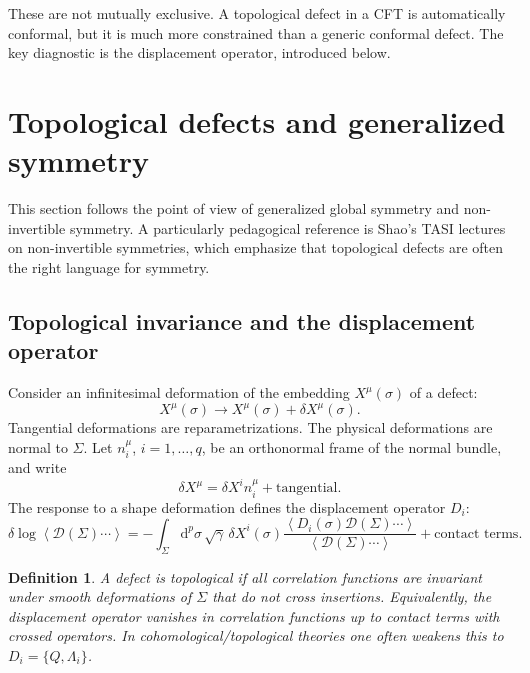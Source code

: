 \documentclass[11pt]{article}
\newtheorem{definition}[theorem]{Definition}
\newcommand{\dd}{\mathrm{d}}
\newcommand{\cD}{\mathcal{D}}
\newcommand{\vev}[1]{\left\langle #1\right\rangle}
\begin{document}
These are not mutually exclusive.  A topological defect in a CFT is automatically conformal, but it is much more constrained than a generic conformal defect.  The key diagnostic is the displacement operator, introduced below.

\section{Topological defects and generalized symmetry}

This section follows the point of view of generalized global symmetry and non-invertible symmetry.  A particularly pedagogical reference is Shao's TASI lectures on non-invertible symmetries, which emphasize that topological defects are often the right language for symmetry.

\subsection{Topological invariance and the displacement operator}

Consider an infinitesimal deformation of the embedding $X^\mu(\sigma)$ of a defect:
\begin{equation}
  X^\mu(\sigma)\longrightarrow X^\mu(\sigma)+\delta X^\mu(\sigma) .
\end{equation}
Tangential deformations are reparametrizations.  The physical deformations are normal to $\Sigma$.  Let $n_i^\mu$, $i=1,\dots,q$, be an orthonormal frame of the normal bundle, and write
\begin{equation}
  \delta X^\mu=\delta X^i n_i^\mu+\text{tangential} .
\end{equation}
The response to a shape deformation defines the displacement operator $D_i$:
\begin{equation}
  \delta \log \vev{\cD(\Sigma)\cdots}
  =-\int_\Sigma \dd^p\sigma\,\sqrt{\gamma}\,\delta X^i(\sigma)
  \frac{\vev{D_i(\sigma)\cD(\Sigma)\cdots}}{\vev{\cD(\Sigma)\cdots}}+\text{contact terms} .
  \label{eq:shapevariation}
\end{equation}

\begin{definition}
A defect is topological if all correlation functions are invariant under smooth deformations of $\Sigma$ that do not cross insertions.  Equivalently, the displacement operator vanishes in correlation functions up to contact terms with crossed operators.  In cohomological/topological theories one often weakens this to $D_i=\{Q,\Lambda_i\}$.
\end{definition}
\end{document}
